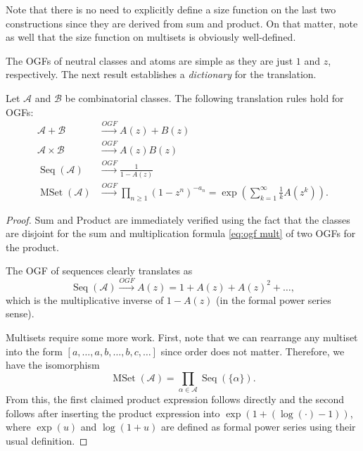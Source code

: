 Note that there is no need to explicitly define a size function on the last two constructions since they are derived from sum and product.
On that matter, note as well that the size function on multisets is obviously well-defined.

The OGFs of neutral classes and atoms are simple as they are just $1$ and $z$, respectively.
The next result establishes a \textit{dictionary} for the translation.

\begin{thm}
\label{thm:unlabelled dict}
Let $\mathcal{A}$ and $\mathcal{B}$ be combinatorial classes. 
The following translation rules hold for OGFs:
\begin{align*}
    \mathcal{A} + \mathcal{B} &\xrightarrow{OGF} A(z) + B(z) \\
    \mathcal{A} \times \mathcal{B} &\xrightarrow{OGF} A(z) B(z) \\
    \operatorname{Seq}(\mathcal{A}) &\xrightarrow{OGF} \frac{1}{1-A(z)} \\
    \operatorname{MSet}(\mathcal{A}) &\xrightarrow{OGF} \prod_{n\geq 1} (1-z^n)^{-a_n} = \exp\left( \sum_{k=1}^\infty \frac{1}{k} A(z^k) \right).
\end{align*}
\end{thm}
\begin{proof}
Sum and Product are immediately verified using the fact that the classes are disjoint for the sum and multiplication formula \eqref{eq:ogf mult} of two OGFs for the product.

The OGF of sequences clearly translates as 
\begin{equation*}
    \operatorname{Seq}(\mathcal{A}) \xrightarrow{OGF} A(z) = 1 + A(z) + A(z)^2 + \dots, 
\end{equation*}
which is the multiplicative inverse of $1 - A(z)$ (in the formal power series sense).

Multisets require some more work.
First, note that we can rearrange any multiset into the form $[a, \dots, a, b, \dots, b, c, \dots]$ since order does not matter.
Therefore, we have the isomorphism
\begin{equation*}
    \operatorname{MSet}(\mathcal{A}) = \prod_{\alpha \in \mathcal{A}} \operatorname{Seq}(\{\alpha\}).
\end{equation*}
From this, the first claimed product expression follows directly and the second follows after inserting the product expression into $\exp(1 + (\log(\cdot) - 1))$, where $\exp(u)$ and $\log(1+u)$ are defined as formal power series using their usual definition.
\end{proof}

